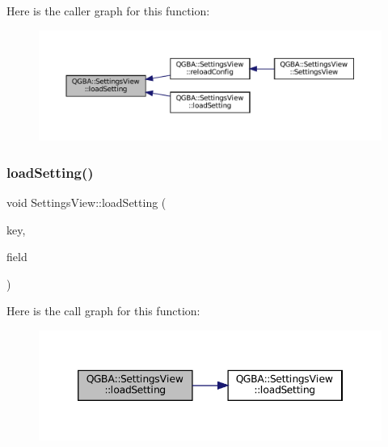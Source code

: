 Here is the caller graph for this function\+:
\nopagebreak
\begin{figure}[H]
\begin{center}
\leavevmode
\includegraphics[width=350pt]{class_q_g_b_a_1_1_settings_view_aa3ea5e48a361a04fdd17a0fce6eeed26_icgraph}
\end{center}
\end{figure}
\mbox{\label{class_q_g_b_a_1_1_settings_view_ac6080db7cafa141018f7ca7d32ab7221}} 
\subsubsection{\texorpdfstring{load\+Setting()}{loadSetting()}\hspace{0.1cm}{\footnotesize\ttfamily [2/7]}}
{\footnotesize\ttfamily void Settings\+View\+::load\+Setting (\begin{DoxyParamCaption}\item[{const char $\ast$}]{key,  }\item[{Q\+Combo\+Box $\ast$}]{field }\end{DoxyParamCaption})\hspace{0.3cm}{\ttfamily [private]}}

Here is the call graph for this function\+:
\nopagebreak
\begin{figure}[H]
\begin{center}
\leavevmode
\includegraphics[width=346pt]{class_q_g_b_a_1_1_settings_view_ac6080db7cafa141018f7ca7d32ab7221_cgraph}
\end{center}
\end{figure}
\mbox{\label{class_q_g_b_a_1_1_settings_view_aabce42d869bce442ffc165e27c865034}} 

